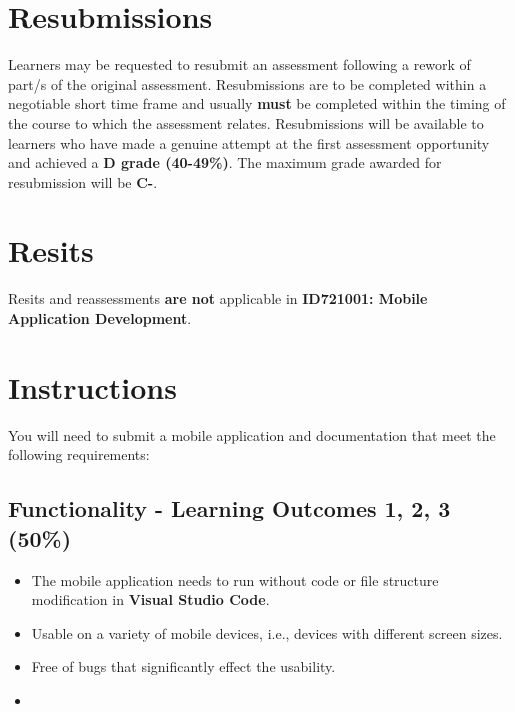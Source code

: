 \documentclass{article}
\begin{document}
\section*{Resubmissions}
Learners may be requested to resubmit an assessment following a rework of part/s of the original assessment. Resubmissions are to be completed within a negotiable short time frame and usually \textbf{must} be completed within the timing of the course to which the assessment relates. Resubmissions will be available to learners who have made a genuine attempt at the first assessment opportunity and achieved a \textbf{D grade (40-49\%)}. The maximum grade awarded for resubmission will be \textbf{C-}.

\section*{Resits}
Resits and reassessments \textbf{are not} applicable in \textbf{ID721001: Mobile Application Development}.

\section*{Instructions}
You will need to submit a mobile application and documentation that meet the following requirements:

\subsection*{Functionality - Learning Outcomes 1, 2, 3 (50\%)}
\begin{itemize}
  \item The mobile application needs to run without code or file structure modification in \textbf{Visual Studio Code}.
	\item Usable on a variety of mobile devices, i.e., devices with different screen sizes.
	\item Free of bugs that significantly effect the usability.
	\item 
\end{itemize}
\end{document}
